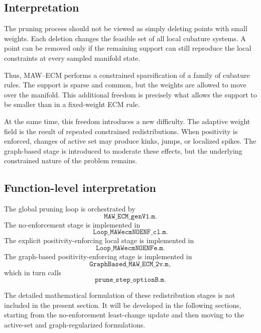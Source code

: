 \documentclass[11pt,a4paper]{article}
\begin{document}
\subsection{Interpretation}

The pruning process should not be viewed as simply deleting points with small
weights. Each deletion changes the feasible set of all local cubature systems.
A point can be removed only if the remaining support can still reproduce the
local constraints at every sampled manifold state.

Thus, MAW--ECM performs a constrained sparsification of a family of cubature
rules. The support is sparse and common, but the weights are allowed to move
over the manifold. This additional freedom is precisely what allows the support
to be smaller than in a fixed-weight ECM rule.

At the same time, this freedom introduces a new difficulty. The adaptive weight
field is the result of repeated constrained redistributions. When positivity is
enforced, changes of active set may produce kinks, jumps, or localized spikes.
The graph-based stage is introduced to moderate these effects, but the
underlying constrained nature of the problem remains.

\subsection{Function-level interpretation}

The global pruning loop is orchestrated by
\[
        \texttt{MAW\_ECM\_genV1.m}.
\]
The no-enforcement stage is implemented in
\[
        \texttt{Loop\_MAWecmNOENF\_cl.m}.
\]
The explicit positivity-enforcing local stage is implemented in
\[
        \texttt{Loop\_MAWecmNOENFe.m}.
\]
The graph-based positivity-enforcing stage is implemented in
\[
        \texttt{GraphBased\_MAW\_ECM\_2v.m},
\]
which in turn calls
\[
        \texttt{prune\_step\_optionB.m}.
\]

The detailed mathematical formulation of these redistribution stages is not
included in the present section. It will be developed in the following sections,
starting from the no-enforcement least-change update and then moving to the
active-set and graph-regularized formulations.


\end{document}
